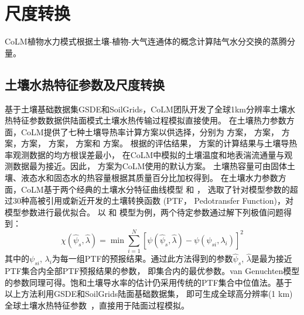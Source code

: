 \chapter{尺度转换}\label{尺度转换}
CoLM植物水力模式根据土壤-植物-大气连通体的概念计算陆气水分交换的蒸腾分量。

\section{土壤水热特征参数及尺度转换}\label{土壤水热特征参数及尺度转换}

基于土壤基础数据集GSDE和SoilGrids，CoLM团队开发了全球1km分辨率土壤水热特征参数数据供陆面模式土壤水热传输过程模拟直接使用。
在土壤热力参数方面，CoLM提供了七种土壤导热率计算方案以供选择，分别为 \citet{farouki1981thermal}方案，\citet{Johansen1975} 方案，
\citet{cote2005} 方案，\citet{balland2005}方案，\citet{lu2007improved} 方案，\citet{tarnawski2012series} 方案和 \citet{de1963thermal} 方案。
根据\citet{dai2019evaluation}的评估结果，\citet{balland2005} 方案的计算结果与土壤导热率观测数据的均方根误差最小，
在CoLM中模拟的土壤温度和地表湍流通量与观测数据最为接近。因此，\citet{balland2005} 方案为CoLM使用的默认方案。
土壤热容量可由固体土壤、液态水和固态水的热容量根据其质量百分比加权得到。
在土壤水力参数方面，CoLM基于两个经典的土壤水分特征曲线模型 \citet{campbell1974} 和 \citet{van1980closed}，
选取了针对模型参数的超过30种高被引用或新近开发的土壤转换函数 (PTF， Pedotransfer Function)，对模型参数进行最优拟合。
以\citet{balland2005} 和 \citet{campbell1974} 模型为例，两个待定参数通过解下列极值问题得到：
\begin{equation}
\chi\left(\hat{\psi}_{s}, \hat{\lambda}\right)=\min \sum_{i=1}^{N}\left[\psi\left(\hat{\psi}_{s}, \hat{\lambda}\right)-\psi\left(\psi_{s i}, \lambda_{i}\right)\right]^{2}
\end{equation}
%
其中的$\psi_{s i}$, $\lambda_{i}$为每一组PTF的预报结果。通过此方法得到的参数$\hat{\psi}_{s}$, $\hat{\lambda}$是最为接近PTF集合内全部PTF预报结果的参数，
即集合内的最优参数。van Genuchten模型的参数同理可得。饱和土壤导水率的估计仍采用传统的PTF集合中位值法。基于以上方法利用GSDE和SoilGrids陆面基础数据集，
即可生成全球高分辨率(1 km)全球土壤水热特征参数~\citep{dai2019evaluation}，直接用于陆面过程模拟。


